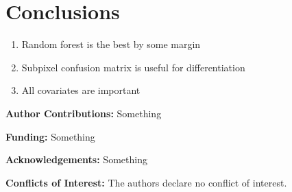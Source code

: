 \documentclass[a4paper,10pt]{article}
\newcommand{\minisection}[1]{\medskip \textbf{#1:}}
\begin{document}
\section{Conclusions}

\begin{enumerate}
 \item Random forest is the best by some margin
 \item Subpixel confusion matrix is useful for differentiation
 \item All covariates are important
\end{enumerate}

\minisection{Author Contributions} Something

\minisection{Funding} Something

\minisection{Acknowledgements} Something

\minisection{Conflicts of Interest} The authors declare no conflict of interest.


\printnoidxglossary[type=acronym]
\end{document}
